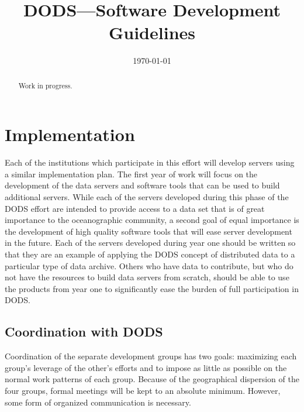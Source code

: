 
%
%






\title{DODS---Software Development Guidelines}
\author{}
\date{\today}

\maketitle

\begin{abstract}
Work in progress.
\end{abstract}




\tableofcontents

\newpage

\section{Implementation}

Each of the institutions which participate in this effort will develop
servers using a similar implementation plan. The first year of work will
focus on the development of the data servers and software tools that can be
used to build additional servers. While each of the servers developed during
this phase of the DODS effort are intended to provide access to a data set
that is of great importance to the oceanographic community, a second goal of
equal importance is the development of high quality software tools that will
ease server development in the future. Each of the servers developed during
year one should be written so that they are an example of applying the
DODS concept of distributed data to a particular type of data archive. Others
who have data to contribute, but who do not have the resources to build data
servers from scratch, should be able to use the products from year one to
significantly ease the burden of full participation in DODS.

\subsection{Coordination with DODS}

Coordination of the separate development groups has two goals: maximizing
each group's leverage of the other's efforts and to impose as little as
possible on the normal work patterns of each group. Because of the
geographical dispersion of the four groups, formal meetings will be kept to
an absolute minimum. However, some form of organized communication is
necessary.

